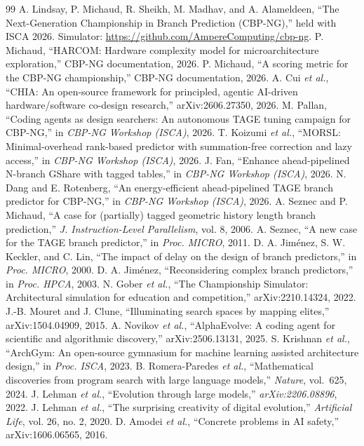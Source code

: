 \documentclass[conference]{IEEEtran}
\begin{document}
\balance
\begin{thebibliography}{99}
 A. Lindsay, P. Michaud, R. Sheikh, M. Madhav, and A. Alameldeen,
``The Next-Generation Championship in Branch Prediction (CBP-NG),'' held with
ISCA 2026. Simulator: \url{https://github.com/AmpereComputing/cbp-ng}.
 P. Michaud, ``HARCOM: Hardware complexity model for
microarchitecture exploration,'' CBP-NG documentation, 2026.
 P. Michaud, ``A scoring metric for the CBP-NG
championship,'' CBP-NG documentation, 2026.
 A. Cui \emph{et al.}, ``CHIA: An open-source framework for
principled, agentic AI-driven hardware/software co-design research,''
arXiv:2606.27350, 2026.
 M. Pallan, ``Coding agents as design searchers: An autonomous
TAGE tuning campaign for CBP-NG,'' in \emph{CBP-NG Workshop (ISCA)}, 2026.
 T. Koizumi \emph{et al.}, ``MORSL: Minimal-overhead
rank-based predictor with summation-free correction and lazy access,'' in
\emph{CBP-NG Workshop (ISCA)}, 2026.
 J. Fan, ``Enhance ahead-pipelined N-branch GShare with tagged
tables,'' in \emph{CBP-NG Workshop (ISCA)}, 2026.
 N. Dang and E. Rotenberg, ``An energy-efficient ahead-pipelined
TAGE branch predictor for CBP-NG,'' in \emph{CBP-NG Workshop (ISCA)}, 2026.
 A. Seznec and P. Michaud, ``A case for (partially)
tagged geometric history length branch prediction,'' \emph{J. Instruction-Level
Parallelism}, vol. 8, 2006.
 A. Seznec, ``A new case for the TAGE branch
predictor,'' in \emph{Proc. MICRO}, 2011.
 D. A. Jim\'enez, S. W. Keckler, and C. Lin, ``The
impact of delay on the design of branch predictors,'' in \emph{Proc. MICRO},
2000.
 D. A. Jim\'enez, ``Reconsidering complex
branch predictors,'' in \emph{Proc. HPCA}, 2003.
 N. Gober \emph{et al.}, ``The Championship Simulator:
Architectural simulation for education and competition,'' arXiv:2210.14324, 2022.
 J.-B. Mouret and J. Clune, ``Illuminating
search spaces by mapping elites,'' arXiv:1504.04909, 2015.
 A. Novikov \emph{et al.}, ``AlphaEvolve: A coding agent
for scientific and algorithmic discovery,'' arXiv:2506.13131, 2025.
 S. Krishnan \emph{et al.}, ``ArchGym: An open-source
gymnasium for machine learning assisted architecture design,'' in \emph{Proc.
ISCA}, 2023.
 B. Romera-Paredes \emph{et al.}, ``Mathematical discoveries
from program search with large language models,'' \emph{Nature}, vol.\ 625,
2024.
 J. Lehman \emph{et al.}, ``Evolution through large models,''
\emph{arXiv:2206.08896}, 2022.
 J. Lehman \emph{et al.}, ``The surprising
creativity of digital evolution,'' \emph{Artificial Life}, vol. 26, no. 2, 2020.
 D. Amodei \emph{et al.}, ``Concrete problems in
AI safety,'' arXiv:1606.06565, 2016.
\end{thebibliography}
\end{document}
